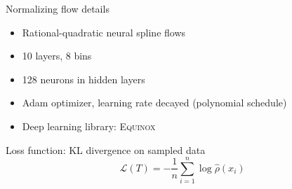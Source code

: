 \documentclass[usenames,dvipsnames,t]{beamer}
\begin{document}
\begin{frame}{Normalizing flow details}

  \def\x{3mm}

  \vspace{\x}

  \begin{itemize}
    \item Rational-quadratic neural spline flows
    
    \vspace{\x}
    
    \item 10 layers, 8 bins
    
    \vspace{\x}
    
    \item 128 neurons in hidden layers
    
    \vspace{\x}
    
    \item Adam optimizer, learning rate decayed (polynomial schedule)
    
    \vspace{\x}
    
    \item Deep learning library: \textsc{Equinox}
  \end{itemize}

  \vspace{\x}

  Loss function: KL divergence on sampled data
  \begin{equation*}
    \mathcal{L}(T) = - \frac1n \sum_{i=1}^n \log \hat{\rho}(x_i)
  \end{equation*}
  
\end{frame}
\end{document}
